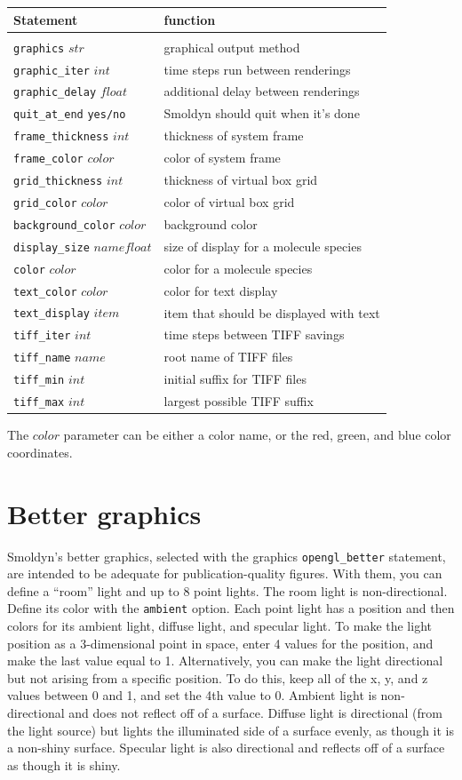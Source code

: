 \documentclass {book}
\newcommand {\ttt} {\texttt}
\begin{document}
\begin{longtable}[c]{ll}
Statement & function\\
\hline\\
\ttt{graphics} $str$ & graphical output method\\
\ttt{graphic\_iter} $int$ & time steps run between renderings\\
\ttt{graphic\_delay} $float$ & additional delay between renderings\\
\ttt{quit\_at\_end} \ttt{yes/no} & Smoldyn should quit when it's done\\
\ttt{frame\_thickness} $int$ & thickness of system frame\\
\ttt{frame\_color} $color$ & color of system frame\\
\ttt{grid\_thickness} $int$ & thickness of virtual box grid\\
\ttt{grid\_color} $color$ & color of virtual box grid\\
\ttt{background\_color} $color$ & background color\\
\ttt{display\_size} $name float$ & size of display for a molecule species\\
\ttt{color} $color$ & color for a molecule species\\
\ttt{text\_color} $color$ & color for text display\\
\ttt{text\_display} $item$ & item that should be displayed with text\\
\ttt{tiff\_iter} $int$ & time steps between TIFF savings\\
\ttt{tiff\_name} $name$ & root name of TIFF files\\
\ttt{tiff\_min} $int$ & initial suffix for TIFF files\\
\ttt{tiff\_max} $int$ & largest possible TIFF suffix\\
\end{longtable}
The $color$ parameter can be either a color name, or the red, green, and blue color coordinates.

\section{Better graphics}

Smoldyn's better graphics, selected with the graphics \ttt{opengl\_better} statement, are intended to be adequate for publication-quality figures. With them, you can define a ``room'' light and up to 8 point lights. The room light is non-directional. Define its color with the \ttt{ambient} option. Each point light has a position and then colors for its ambient light, diffuse light, and specular light. To make the light position as a 3-dimensional point in space, enter 4 values for the position, and make the last value equal to 1. Alternatively, you can make the light directional but not arising from a specific position. To do this, keep all of the x, y, and z values between 0 and 1, and set the 4th value to 0. Ambient light is non-directional and does not reflect off of a surface. Diffuse light is directional (from the light source) but lights the illuminated side of a surface evenly, as though it is a non-shiny surface. Specular light is also directional and reflects off of a surface as though it is shiny.
\end{document}
